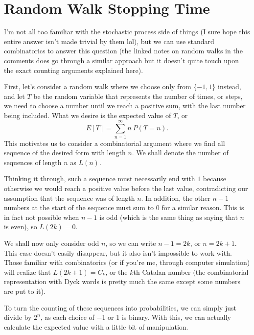 \documentclass[a4paper, 12pt]{article}
\begin{document}
\section*{Random Walk Stopping Time}

I'm not all too familiar with the stochastic process side of things (I sure hope this entire answer isn't made trivial by them lol), but we can use standard combinatorics to answer this question (the linked notes on random walks in the comments does go through a similar approach but it doesn't quite touch upon the exact counting arguments explained here). 

First, let's consider a random walk where we choose only from $\{-1, 1\}$ instead, and let $T$ be the random variable that represents the number of times, or steps, we need to choose a number until we reach a positive sum, with the last number being included. What we desire is the expected value of $T$, or
$$E[T] = \sum_{n = 1}^{\infty} n \>P(T = n).$$
This motivates us to consider a combinatorial argument where we find all sequence of the desired form with length $n$. We shall denote the number of sequences of length $n$ as $L(n)$.

Thinking it through, such a sequence must necessarily end with $1$ because otherwise we would reach a positive value before the last value, contradicting our assumption that the sequence was of length $n$. In addition, the other $n-1$ numbers at the start of the sequence must sum to $0$ for a similar reason. This is in fact not possible when $n-1$ is odd (which is the same thing as saying that $n$ is even), so $L(2k) = 0$.

We shall now only consider odd $n$, so we can write $n - 1 = 2k$, or $n = 2k + 1$. This case doesn't easily disappear, but it also isn't impossible to work with. Those familiar with combinatorics (or if you're me, through computer simulation) will realize that $L(2k + 1) = C_k$, or the $k$th Catalan number (the combinatorial representation with Dyck words is pretty much the same except some numbers are put to it).

To turn the counting of these sequences into probabilities, we can simply just divide by $2^n$, as each choice of $-1$ or $1$ is binary. With this, we can actually calculate the expected value with a little bit of manipulation.
\end{document}
